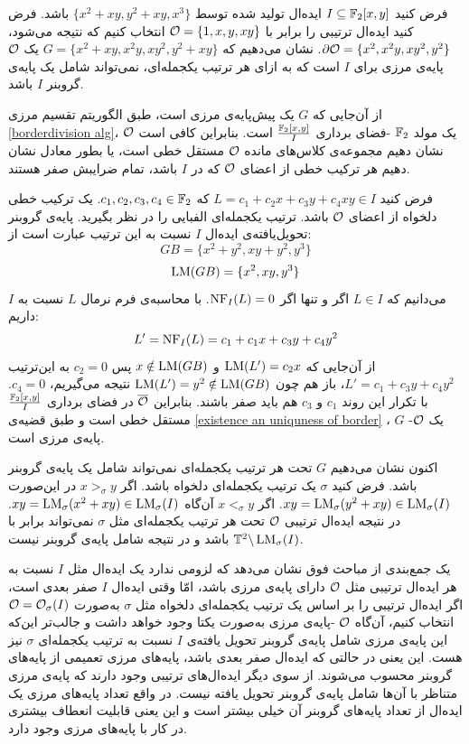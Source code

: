 \begin{example}
فرض کنید 
$I\subseteq \mathbb{F}_{2}[x,y]$
ایده‌ال تولید شده توسط 
$\{x^{2} + xy, y^{2}+xy, x^{3}\}$
باشد. فرض کنید ایده‌ال ترتیبی را برابر با 
${\mathcal O} = \{1,x,y,xy\}$
انتخاب کنیم که نتیجه می‌شود،
$\partial\mathcal{O}  = \{x^{2}, x^{2}y, xy^{2}, y^{2}\}$.
نشان می‌دهیم که 
$G = \{x^{2} + xy, x^{2}y, xy^{2}, y^{2} + xy\}$
یک 
${\mathcal O}$
پایه‌ی مرزی برای 
$I$
است که به ازای هر ترتیب یکجمله‌ای، نمی‌تواند شامل یک پایه‌ی گروبنر 
$I$
باشد.

از آن‌جایی که 
$G$
یک پیش‌پایه‌ی مرزی است، طبق الگوریتم تقسیم مرزی 
\ref{borderdivision alg}،
${\mathcal O}$
یک مولد 
$\mathbb{F}_{2}$
-فضای برداری 
$\frac{\mathbb{F}_{2}[x,y]}{I}$
است. بنابراین کافی است نشان ‌دهیم مجموعه‌ی کلاس‌های مانده 
${\mathcal O}$
مستقل خطی است، یا بطور معادل نشان ‌دهیم هر ترکیب خطی از اعضای 
${\mathcal O}$
که در 
$I$
باشد، تمام ضرایبش  صفر هستند. 

فرض کنید 
$L = c_{1} + c_{2}x + c_{3}y + c_{4}xy\in I$
که 
$c_{1},c_{2},c_{3},c_{4}\in\mathbb{F}_{2}$.
یک ترکیب خطی دلخواه از اعضای 
${\mathcal O}$
باشد. ترتیب یکجمله‌ای الفبایی را در نظر بگیرید. پایه‌ی گروبنر تحویل‌یافته‌ی ایده‌ال 
$I$
نسبت به این ترتیب عبارت است از:
$$GB = \{x^{2} + y^{2}, xy + y^{2}, y^{3}\}$$
$$\operatorname{\mathrm{LM}}(GB) = \{x^{2}, xy, y^{3}\}$$
می‌دانیم که 
$L\in I$
اگر و تنها اگر 
$\operatorname{\mathrm{NF}}_{I}(L) = 0$.
با محاسبه‌ی فرم نرمال 
$L$
نسبت به 
$I$
داریم:
$$L'=\operatorname{\mathrm{NF}}_{I}(L) = c_{1} + c_{1}x + c_{3}y + c_{4}y^{2}$$
از آن‌جایی که 
$\operatorname{\mathrm{LM}}(L') = c_{2}x$
و 
$x\notin \operatorname{\mathrm{LM}}(GB)$
پس 
$c_{2} = 0$
به این‌ترتیب 
$L' = c_{1} + c_{3}y + c_{4}y^{2}$،
باز هم چون 
$\operatorname{\mathrm{LM}}(L') = y^{2}\notin \operatorname{\mathrm{LM}}(GB)$
نتیجه می‌گیریم،
$c_{4} = 0$.
با تکرار این روند 
$c_{1}$
و
$c_{3}$
هم باید صفر باشند.
بنابراین 
$\overline{{\mathcal O}}$
در فضای برداری 
$\frac{\mathbb{F}_{2}[x,y]}{I}$
مستقل خطی است و طبق قضیه‌ی 
\ref{existence an uniquness of border}
،
$G$
یک 
${\mathcal O}$-
پایه‌ی مرزی است. 

اکنون نشان می‌دهیم 
$G$
تحت هر ترتیب یکجمله‌ای نمی‌تواند شامل یک پایه‌ی گروبنر باشد. فرض کنید 
$\sigma$
یک ترتیب یکجمله‌ای دلخواه باشد. اگر 
$x >_{\sigma} y$
در این‌صورت 
$xy = \operatorname{\mathrm{LM}}_{\sigma}(y^{2}+ xy)\in \operatorname{\mathrm{LM}}_{\sigma}(I)$.
اگر 
$x <_{\sigma} y$
آن‌گاه 
$xy = \operatorname{\mathrm{LM}}_{\sigma}(x^{2} + xy)\in\operatorname{\mathrm{LM}}_{\sigma}(I)$.
در نتیجه ایده‌ال ترتیبی 
${\mathcal O}$
تحت هر ترتیب یکجمله‌ای مثل 
$\sigma$
نمی‌تواند برابر با 
$\mathbb{T}^{2}\backslash \operatorname{\mathrm{LM}}_{\sigma}(I)$
باشد و در نتیجه شامل پایه‌ی گروبنر نیست.
\end{example}

یک جمع‌بندی از مباحث فوق نشان می‌دهد که لزومی ندارد یک ایده‌ال  مثل 
$I$
نسبت به هر ایده‌ال ترتیبی مثل 
${\mathcal O}$
دارای پایه‌ی مرزی باشد، امّا وقتی ایده‌ال 
$I$
صفر بعدی است، اگر ایده‌ال ترتیبی را بر اساس یک ترتیب یکجمله‌ای دلخواه مثل 
$\sigma$
به‌صورت 
${\mathcal O} = {\mathcal O}_{\sigma}(I)$
انتخاب کنیم، آن‌گاه 
${\mathcal O}$
-پایه‌ی مرزی به‌صورت یکتا وجود خواهد داشت و جالب‌تر این‌که این پایه‌ی مرزی شامل پایه‌ی گروبنر تحویل یافته‌ی 
$I$
نسبت به ترتیب یکجمله‌ای 
$\sigma$
نیز هست. این یعنی در حالتی که ایده‌ال صفر بعدی باشد، پایه‌‌های مرزی تعمیمی از پایه‌های گروبنر محسوب می‌شوند. از سوی دیگر ایده‌ال‌های ترتیبی وجود دارند که پایه‌ی مرزی متناظر با آن‌ها شامل پایه‌ی گروبنر تحویل یافته نیست. در واقع تعداد پایه‌های مرزی یک ایده‌ال از تعداد پایه‌های گروبنر آن خیلی بیشتر است  و این یعنی قابلیت انعطاف بیشتری در کار با پایه‌های مرزی وجود دارد.

